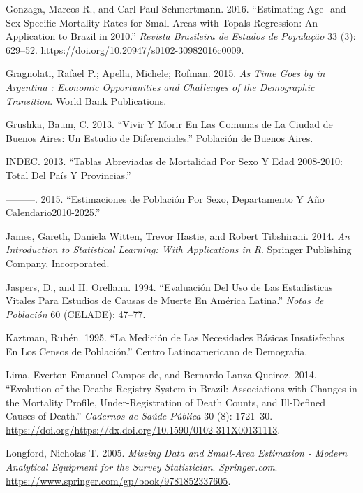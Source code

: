 \documentclass[12pt,]{article}
\begin{document}
\leavevmode\hypertarget{ref-Gonzaga_Schmertmann_2016}{}%
Gonzaga, Marcos R., and Carl Paul Schmertmann. 2016. ``Estimating Age-
and Sex-Specific Mortality Rates for Small Areas with Topals Regression:
An Application to Brazil in 2010.'' \emph{Revista Brasileira de Estudos
de População} 33 (3): 629--52.
\url{https://doi.org/10.20947/s0102-30982016c0009}.

\leavevmode\hypertarget{ref-Gragnolati2015}{}%
Gragnolati, Rafael P.; Apella, Michele; Rofman. 2015. \emph{As Time Goes
by in Argentina : Economic Opportunities and Challenges of the
Demographic Transition}. World Bank Publications.

\leavevmode\hypertarget{ref-Grushka2013}{}%
Grushka, Baum, C. 2013. ``Vivir Y Morir En Las Comunas de La Ciudad de
Buenos Aires: Un Estudio de Diferenciales.'' Población de Buenos Aires.

\leavevmode\hypertarget{ref-INDEC2013}{}%
INDEC. 2013. ``Tablas Abreviadas de Mortalidad Por Sexo Y Edad
2008-2010: Total Del País Y Provincias.''

\leavevmode\hypertarget{ref-INDEC2015}{}%
---------. 2015. ``Estimaciones de Población Por Sexo, Departamento Y
Año Calendario2010-2025.''

\leavevmode\hypertarget{ref-James2014}{}%
James, Gareth, Daniela Witten, Trevor Hastie, and Robert Tibshirani.
2014. \emph{An Introduction to Statistical Learning: With Applications
in R}. Springer Publishing Company, Incorporated.

\leavevmode\hypertarget{ref-JaspersOrellana1994}{}%
Jaspers, D., and H. Orellana. 1994. ``Evaluación Del Uso de Las
Estadísticas Vitales Para Estudios de Causas de Muerte En América
Latina.'' \emph{Notas de Población} 60 (CELADE): 47--77.

\leavevmode\hypertarget{ref-Kaztman1995}{}%
Kaztman, Rubén. 1995. ``La Medición de Las Necesidades Básicas
Insatisfechas En Los Censos de Población.'' Centro Latinoamericano de
Demografía.

\leavevmode\hypertarget{ref-LimaQueiroz2014}{}%
Lima, Everton Emanuel Campos de, and Bernardo Lanza Queiroz. 2014.
``Evolution of the Deaths Registry System in Brazil: Associations with
Changes in the Mortality Profile, Under-Registration of Death Counts,
and Ill-Defined Causes of Death.'' \emph{Cadernos de Saúde Pública} 30
(8): 1721--30.
\url{https://doi.org/https://dx.doi.org/10.1590/0102-311X00131113}.

\leavevmode\hypertarget{ref-Longford2005}{}%
Longford, Nicholas T. 2005. \emph{Missing Data and Small-Area Estimation
- Modern Analytical Equipment for the Survey Statistician}.
\emph{Springer.com}.
\url{https://www.springer.com/gp/book/9781852337605}.
\end{document}
